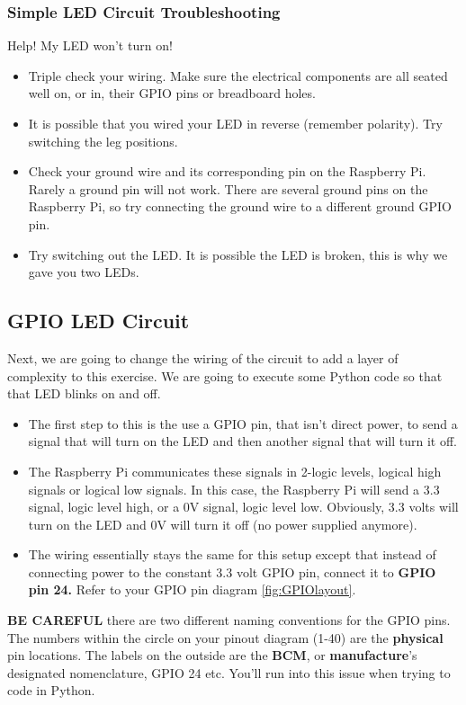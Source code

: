 \documentclass{article}\usepackage[]{graphicx}\usepackage[]{color}
\begin{document}
\subsubsection{Simple LED Circuit Troubleshooting}
Help! My LED won't turn on!
\begin{itemize}
\item Triple check your wiring. Make sure the electrical components are all seated well on, or in, their GPIO pins or breadboard holes.
\item It is possible that you wired your LED in reverse (remember polarity). Try switching the leg positions.
\item Check your ground wire and its corresponding pin on the Raspberry Pi. Rarely a ground pin will not work. There are several ground pins on the Raspberry Pi, so try connecting the ground wire to a different ground GPIO pin.
\item Try switching out the LED. It is possible the LED is broken, this is why we gave you two LEDs.
\end{itemize}

\subsection{GPIO LED Circuit}
Next, we are going to change the wiring of the circuit to add a layer of complexity to this exercise. We are going to execute some Python code so that that LED blinks on and off.
\begin{itemize}
\item The first step to this is the use a GPIO pin, that isn't direct power, to send a signal that will turn on the LED and then another signal that will turn it off.
\item The Raspberry Pi communicates these signals in 2-logic levels, logical high signals or logical low signals. In this case, the Raspberry Pi will send a 3.3 signal, logic level high, or a 0V signal, logic level low. Obviously, 3.3 volts will turn on the LED and 0V will turn it off (no power supplied anymore).
\item The wiring essentially stays the same for this setup except that instead of connecting power to the constant 3.3 volt GPIO pin, connect it to \textbf{GPIO pin 24.} Refer to your GPIO pin diagram \ref{fig:GPIOlayout}.
\end{itemize}
\textbf{BE CAREFUL} there are two different naming conventions for the GPIO pins. The numbers within the circle on your pinout diagram (1-40) are the \textbf{physical} pin locations. The labels on the outside are the \textbf{BCM}, or \textbf{manufacture}'s designated nomenclature, GPIO 24 etc. You'll run into this issue when trying to code in Python. \label{GPIO24}
\end{document}
